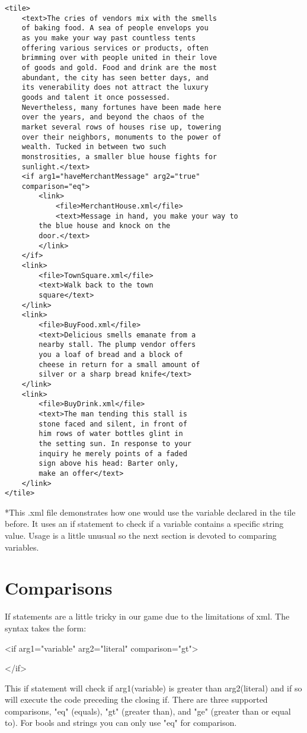\documentclass[11pt]{article}
\begin{document}
\begin{lstlisting}[frame=single]
<tile>
	<text>The cries of vendors mix with the smells 
	of baking food. A sea of people envelops you 
	as you make your way past countless tents 
	offering various services or products, often 
	brimming over with people united in their love 
	of goods and gold. Food and drink are the most 
	abundant, the city has seen better days, and 
	its venerability does not attract the luxury 
	goods and talent it once possessed. 
	Nevertheless, many fortunes have been made here 
	over the years, and beyond the chaos of the 
	market several rows of houses rise up, towering 
	over their neighbors, monuments to the power of 
	wealth. Tucked in between two such 
	monstrosities, a smaller blue house fights for 
	sunlight.</text>
	<if arg1="haveMerchantMessage" arg2="true" 
	comparison="eq">
        <link>
            <file>MerchantHouse.xml</file>
            <text>Message in hand, you make your way to 
		the blue house and knock on the 
		door.</text>
        </link>
	</if>
	<link>
		<file>TownSquare.xml</file>
		<text>Walk back to the town 
		square</text>
	</link>
	<link>
		<file>BuyFood.xml</file>
		<text>Delicious smells emanate from a 
		nearby stall. The plump vendor offers 
		you a loaf of bread and a block of 
		cheese in return for a small amount of 
		silver or a sharp bread knife</text>
	</link>
	<link>
		<file>BuyDrink.xml</file>
		<text>The man tending this stall is 
		stone faced and silent, in front of 
		him rows of water bottles glint in 
		the setting sun. In response to your 
		inquiry he merely points of a faded 
		sign above his head: Barter only, 
		make an offer</text>
	</link>
</tile>
\end{lstlisting}
*This .xml file demonstrates how one would use the variable declared in the tile before. It uses an if statement to check if a variable contains a specific string value. Usage is a little unusual so the next section is devoted to comparing variables.

\section{Comparisons}

If statements are a little tricky in our game due to the limitations of xml. The syntax takes the form: 

\textless if arg1="variable" arg2="literal" comparison="gt"\textgreater

\textless /if\textgreater

This if statement will check if arg1(variable) is greater than arg2(literal) and if so will execute the code preceding the closing if. There are three supported comparisons, "eq" (equals), "gt" (greater than), and "ge" (greater than or equal to). For bools and strings you can only use "eq" for comparison.
\end{document}

